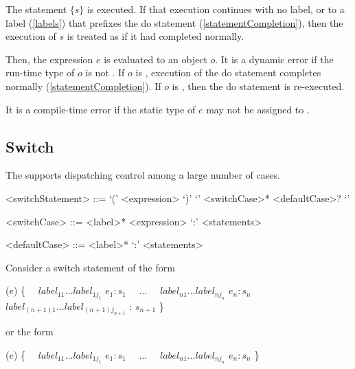 \documentclass[makeidx]{article}
\begin{document}
{\LMHash{}%
The statement $\{s\}$ is executed.
If that execution continues with no label,
or to a label (\ref{labels}) that prefixes the do statement
(\ref{statementCompletion}),
then the execution of $s$ is treated as if it had completed normally.

\LMHash{}%
Then, the expression $e$ is evaluated to an object $o$.
It is a dynamic error if the run-time type of $o$ is not .
If $o$ is \FALSE, execution of the do statement completes normally
(\ref{statementCompletion}).
If $o$ is \TRUE, then the do statement is re-executed.

\LMHash{}%
It is a compile-time error if the static type of $e$
may not be assigned to .


\subsection{Switch}

\LMHash{}%
The  supports dispatching control among
a large number of cases.

\begin{grammar}
<switchStatement> ::= \gnewline{}
  \SWITCH{} `(' <expression> `)' `{' <switchCase>* <defaultCase>? `}'

<switchCase> ::= <label>* \CASE{} <expression> `:' <statements>

<defaultCase> ::= <label>* \DEFAULT{} `:' <statements>
\end{grammar}

\LMHash{}%
Consider a switch statement of the form

\begin{normativeDartCode}
\SWITCH{} ($e$) \{
\ \ $label_{11} \ldots label_{1j_1}$ \CASE{} $e_1: s_1$
\ \ $\ldots$
\ \ $label_{n1} \ldots label_{nj_n}$ \CASE{} $e_n: s_n$
\ \ $label_{(n+1)1} \ldots label_{(n+1)j_{n+1}}$ \DEFAULT{}: $s_{n+1}$
\}
\end{normativeDartCode}

\noindent
or the form

\begin{normativeDartCode}
\SWITCH{} ($e$) \{
\ \ $label_{11} \ldots label_{1j_1}$ \CASE{} $e_1: s_1$
\ \ $\ldots$
\ \ $label_{n1} \ldots label_{nj_n}$ \CASE{} $e_n: s_n$
\}
\end{normativeDartCode}


}
\end{document}
